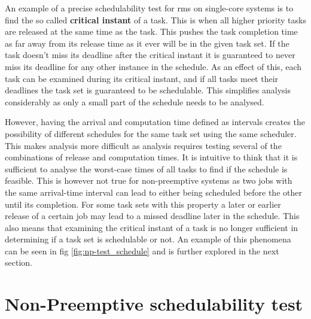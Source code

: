 \documentclass{kththesis}
\begin{document}
An example of a precise schedulability test for \acrshort{rms} on single-core systems is to find the
so called \textbf{critical instant} of a task. This is when all higher priority tasks are released
at the same time as the task. This pushes the task completion time as far away from its release time
as it ever will be in the given task set. If the task doesn't miss its deadline after the critical
instant it is guaranteed to never miss its deadline for any other instance in the schedule. As an
effect of this, each task can be examined during its critical instant, and if all tasks meet their
deadlines the task set is guaranteed to be schedulable. This simplifies analysis considerably as
only a small part of the schedule needs to be analysed.

However, having the arrival and computation time defined as intervals creates the possibility of
different schedules for the same task set using the same scheduler. This makes analysis more
difficult as analysis requires testing several of the combinations of release and computation times.
It is intuitive to think that it is sufficient to analyse the worst-case times of all tasks to find
if the schedule is feasible. This is however not true for non-preemptive systems as two jobs with
the same arrival-time interval can lead to either being scheduled before the other until its
completion. For some task sets with this property a later or earlier release of a certain job may
lead to a missed deadline later in the schedule. This also means that examining the critical instant
of a task is no longer sufficient in determining if a task set is schedulable or not. An example of
this phenomena can be seen in fig \ref{fig:np-test_schedule} and is further explored in the next
section.


\section{Non-Preemptive schedulability test} \label{sec:np-test}
\end{document}
